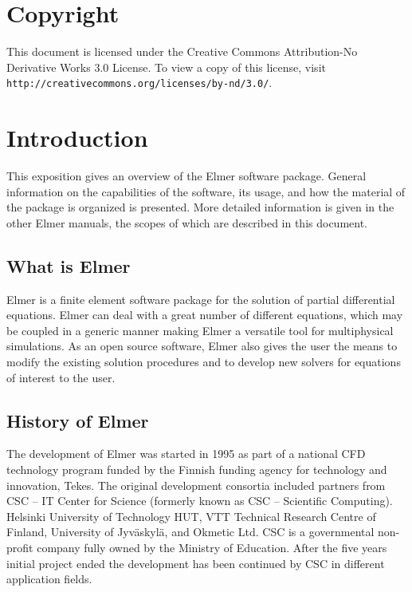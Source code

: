 \section*{Copyright}

This document is licensed under the Creative Commons Attribution-No Derivative Works 3.0 License. 
To view a copy of this license, visit \texttt{http://creativecommons.org/licenses/by-nd/3.0/}.

\section{Introduction}

This exposition gives an overview of the Elmer software package. General information 
on the capabilities of the software, its usage, and how the material of the package 
is organized is presented. More detailed information is given
in the other Elmer manuals, the scopes of which are described in this document.

\subsection*{What is Elmer}

Elmer is a finite element software package for the solution of partial differential 
equations. Elmer can deal with a great number of different equations, which may be coupled 
in a generic manner making Elmer a versatile tool for multiphysical simulations. 
As an open source software, Elmer also gives the user the means to modify the existing 
solution procedures and to develop new solvers for equations of interest to the user.  

\subsection*{History of Elmer}
The development of Elmer was started in 1995 as part of a national CFD technology 
program funded by the Finnish funding agency for technology and innovation, Tekes. 
The original development consortia included partners from CSC -- IT Center 
for Science (formerly known as CSC -- Scientific Computing). 
Helsinki University of Technology HUT, VTT Technical Research Centre of Finland,
University of Jyv{\"a}skyl{\"a}, and Okmetic Ltd. 
CSC is a governmental non-profit company fully owned by the Ministry of Education. 
After the five years initial project ended 
the development has been continued by CSC in different application fields.

